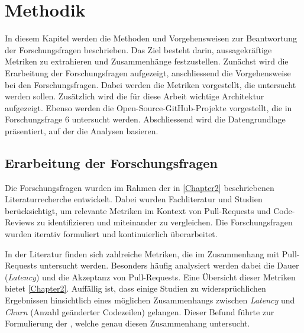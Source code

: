 


\chapter{Methodik} %

\label{Chapter3} %

In diesem Kapitel werden die Methoden und Vorgehensweisen zur Beantwortung der Forschungsfragen beschrieben. Das Ziel besteht darin, aussagekräftige Metriken zu extrahieren und Zusammenhänge festzustellen.
Zunächst wird die Erarbeitung der Forschungsfragen aufgezeigt, anschliessend die Vorgehensweise bei den Forschungsfragen. Dabei werden die Metriken vorgestellt, die untersucht werden sollen. Zusätzlich wird die für diese Arbeit wichtige Architektur aufgezeigt. Ebenso werden die Open-Source-GitHub-Projekte vorgestellt, die in Forschungsfrage 6 untersucht werden. Abschliessend wird die Datengrundlage präsentiert, auf der die Analysen basieren.

\section{Erarbeitung der Forschungsfragen}
\label{sec:ErarbeitungFF}
Die Forschungsfragen wurden im Rahmen der in \autoref{Chapter2} beschriebenen Literaturrecherche entwickelt. Dabei wurden Fachliteratur und Studien berücksichtigt, um relevante Metriken im Kontext von Pull-Requests und Code-Reviews zu identifizieren und miteinander zu vergleichen. Die Forschungsfragen wurden iterativ formuliert und kontinuierlich überarbeitet.

In der Literatur finden sich zahlreiche Metriken, die im Zusammenhang mit Pull-Requests untersucht werden. Besonders häufig analysiert werden dabei die Dauer (\textit{Latency}) und die Akzeptanz von Pull-Requests. Eine Übersicht dieser Metriken bietet \autoref{Chapter2}. Auffällig ist, dass einige Studien zu widersprüchlichen Ergebnissen hinsichtlich eines möglichen Zusammenhangs zwischen \textit{Latency} und \textit{Churn} (Anzahl geänderter Codezeilen) gelangen. Dieser Befund führte zur Formulierung der , welche genau diesen Zusammenhang untersucht.

